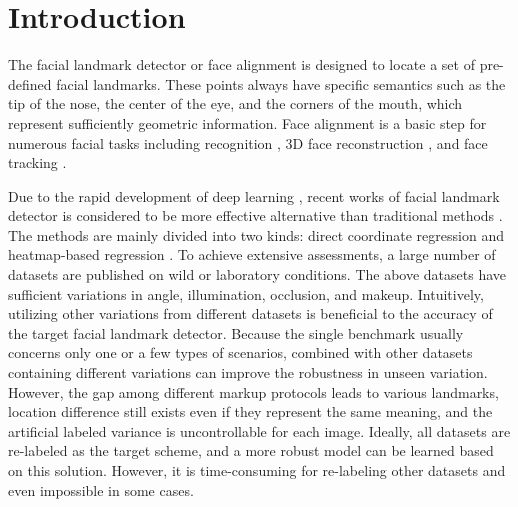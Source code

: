 \documentclass[journal,transmag]{IEEEtran}
\begin{document}
\section{Introduction}
\label{sec:intro}

The facial landmark detector or face alignment is designed to locate a set of pre-defined facial landmarks.
These points always have specific semantics such as the tip of the nose, the center of the eye, and the corners of the mouth, which represent sufficiently geometric information.
Face alignment is a basic step for numerous facial tasks including recognition \cite{liu2017sphereface}, 3D face reconstruction \cite{feng2018joint}, and face tracking \cite{khan2017synergy}.

Due to the rapid development of deep learning \cite{lecun2015deep,schmidhuber2015deep,deng2014deep}, 
recent works of facial landmark detector is considered to be more effective alternative than traditional methods \cite{Timothy1995Active,cootes2001active,cristinacce2008automatic,xiong2013supervised}.
The methods are mainly divided into two kinds: direct coordinate regression \cite{sun2013deep,zhang2014facial,feng2018wing,dong2018style} and heatmap-based regression \cite{kowalski2017deep,LABWFLW,HRNET}.
To achieve extensive assessments, a large number of datasets\cite{LABWFLW,300W,COFW,AFLW} are published on wild or laboratory conditions.
The above datasets have sufficient variations in angle, illumination, occlusion, and makeup.
Intuitively, utilizing other variations from different datasets is beneficial to the accuracy of the target facial landmark detector.
Because the single benchmark usually concerns only one or a few types of scenarios, combined with other datasets containing different variations can improve the robustness in unseen variation.
However, the gap among different markup protocols leads to various landmarks, 
location difference still exists even if they represent the same meaning, 
and the artificial labeled variance is uncontrollable for each image.
Ideally, all datasets are re-labeled as the target scheme, and a more robust model can be learned based on this solution.
However, it is time-consuming for re-labeling other datasets and even impossible in some cases. 

\end{document}
